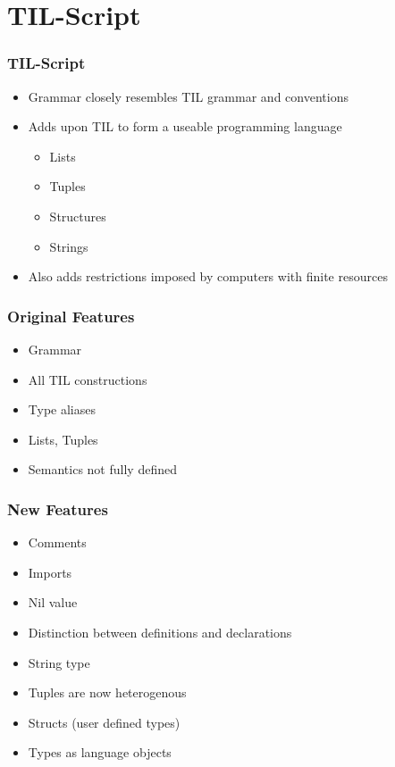 \documentclass{beamer}
\begin{document}
\section{TIL-Script}

\begin{frame}
    \frametitle{TIL-Script}
    \begin{itemize}
        \item Grammar closely resembles TIL grammar and conventions
        \item Adds upon TIL to form a useable programming language
            \begin{itemize}
                \item Lists
                \item Tuples
                \item Structures
                \item Strings
            \end{itemize}
        \item Also adds restrictions imposed by computers with finite resources
    \end{itemize}
\end{frame}

\begin{frame}
    \frametitle{Original Features}
    \begin{itemize}
        \item Grammar
        \item All TIL constructions
        \item Type aliases
        \item Lists, Tuples
        \item Semantics not fully defined
    \end{itemize}
\end{frame}

\begin{frame}
    \frametitle{New Features}
    \begin{itemize}
        \item Comments
        \item Imports
        \item Nil value
        \item Distinction between definitions and declarations
        \item String type
        \item Tuples are now heterogenous
        \item Structs (user defined types)
        \item Types as language objects
    \end{itemize}
\end{frame}
\end{document}

